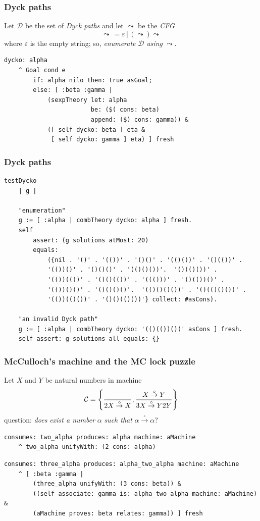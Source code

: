 \documentclass[9pt]{beamer}
\begin{document}
\begin{frame}[fragile]
\frametitle{Dyck paths}
Let $\mathcal{D}$ be the set of \textit{Dyck paths} and let $\leadsto$ be the \textit{CFG}
$$
\leadsto \,= \varepsilon \,\left|\, ( \leadsto ) \leadsto \right.
$$
where $\varepsilon$ is the empty string; so, \textit{enumerate} $\mathcal{D}$
\textit{using} $\leadsto$.
\begin{verbatim}
dycko: alpha
    ^ Goal cond e
        if: alpha nilo then: true asGoal;
        else: [ :beta :gamma |
            (sexpTheory let: alpha
                        be: ($( cons: beta)
                        append: ($) cons: gamma)) &
            ([ self dycko: beta ] eta &
             [ self dycko: gamma ] eta) ] fresh
\end{verbatim}
\end{frame}

\begin{frame}[fragile]
\frametitle{Dyck paths}
\begin{verbatim}
testDycko
    | g |

    "enumeration"
    g := [ :alpha | combTheory dycko: alpha ] fresh.
    self
        assert: (g solutions atMost: 20)
        equals:
            ({nil . '()' . '(())' . '()()' . '(()())' . '()(())' .
            '(())()' . '()()()' . '(()()())'.  '()(()())' .
            '(())(())' . '()()(())' . '((()))' . '()(())()' .
            '(())()()' . '()()()()'.  '(()()()())' . '()(()()())' .
            '(())(()())' . '()()(()())'} collect: #asCons).

    "an invalid Dyck path"
    g := [ :alpha | combTheory dycko: '(()(())()(' asCons ] fresh.
    self assert: g solutions all equals: {}
\end{verbatim}
\end{frame}

\begin{frame}[fragile]
\frametitle{McCulloch's machine and the MC lock puzzle}
Let $X$ and $Y$ be natural numbers in machine
\begin{displaymath}
\mathcal{C} =  \left \lbrace{ \over 2X \stackrel{\circ}{\rightarrow} X} , {X \stackrel{\circ}{\rightarrow} Y \over 3X \stackrel{\circ}{\rightarrow} Y 2 Y} \right \rbrace
\end{displaymath}
question: \textit{does exist a number} $\alpha$ \textit{such that} $ \alpha \stackrel{\circ}{\rightarrow} \alpha $?
\begin{verbatim}
consumes: two_alpha produces: alpha machine: aMachine
    ^ two_alpha unifyWith: (2 cons: alpha)
\end{verbatim}
\begin{verbatim}
consumes: three_alpha produces: alpha_two_alpha machine: aMachine
    ^ [ :beta :gamma |
        (three_alpha unifyWith: (3 cons: beta)) &
        ((self associate: gamma is: alpha_two_alpha machine: aMachine) &
        (aMachine proves: beta relates: gamma)) ] fresh
\end{verbatim}
\end{frame}
\end{document}
